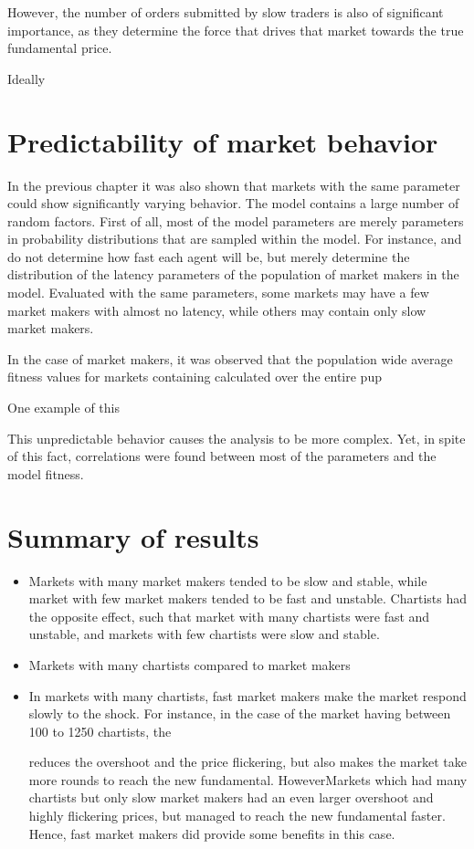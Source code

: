 However, the number of orders submitted by slow traders is also of significant importance, as they determine the force that drives that market towards the true fundamental price.

Ideally


\section{Predictability of market behavior}
In the previous chapter it was also shown that markets with the same parameter could show significantly varying behavior. The model contains a large number of random factors. First of all, most of the model parameters are merely parameters in probability distributions that are sampled within the model. For instance, \ssmmlatencymu{} and \ssmmlatencys{} do not determine how fast each agent will be, but merely determine the distribution of the latency parameters of the population of market makers in the model. Evaluated with the same parameters, some markets may have a few market makers with almost no latency, while others may contain only slow market makers. 

In the case of market makers, it was observed that the population wide average fitness values for markets containing calculated over the entire pup

One example of this 

This unpredictable behavior causes the analysis to be more complex. Yet, in spite of this fact, correlations were found between most of the parameters and the model fitness.












\section{Summary of results}
\begin{itemize}
\item Markets with many market makers tended to be slow and stable, while market with few market makers tended to be fast and unstable. Chartists had the opposite effect, such that market with many chartists were fast and unstable, and markets with few chartists were slow and stable.
\item Markets with many chartists compared to market makers 

\item In markets with many chartists, fast market makers make the market respond slowly to the shock. For instance, in the case of the market having between 100 to 1250 chartists, the 

reduces the overshoot and the price flickering, but also makes the market take more rounds to reach the new fundamental. HoweverMarkets which had many chartists but only slow market makers had an even larger overshoot and highly flickering prices, but managed to reach the new fundamental faster. Hence, fast market makers did provide some benefits in this case.



\end{itemize}


